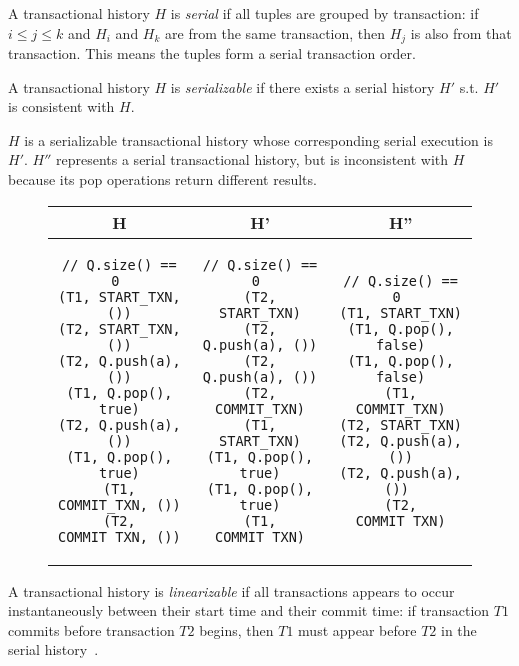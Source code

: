 \begin{defn}
    A transactional history $H$ is \emph{serial} if all tuples are grouped by transaction: if $i\le j\le k$ and $H_i$ and $H_k$ are from the same transaction, then $H_j$ is also from that transaction. This means the tuples form a serial transaction order.
\end{defn}
\begin{defn}
    A transactional history $H$ is \emph{serializable} if there exists a serial history $H'$ s.t. $H'$ is consistent with $H$.

\end{defn}

\begin{eg}
    $H$ is a serializable transactional history whose corresponding serial execution is $H'$. $H''$ represents a serial transactional history, but is inconsistent with $H$ because its pop operations return different results.
\begin{figure}[H]
\singlespacing   
   \begin{tabular}{c|c|c}
H & H' & H''\\
\hline
\begin{lstlisting}
// Q.size() == 0 
(T1, START_TXN, ())
(T2, START_TXN, ())
(T2, Q.push(a), ())
(T1, Q.pop(), true)
(T2, Q.push(a), ())
(T1, Q.pop(), true)
(T1, COMMIT_TXN, ())
(T2, COMMIT_TXN, ())
\end{lstlisting} & 
\begin{lstlisting}
// Q.size() == 0 
(T2, START_TXN)
(T2, Q.push(a), ())
(T2, Q.push(a), ())
(T2, COMMIT_TXN)
(T1, START_TXN)
(T1, Q.pop(), true)
(T1, Q.pop(), true)
(T1, COMMIT_TXN)
\end{lstlisting} &
\begin{lstlisting}
// Q.size() == 0 
(T1, START_TXN)
(T1, Q.pop(), false)
(T1, Q.pop(), false)
(T1, COMMIT_TXN)
(T2, START_TXN)
(T2, Q.push(a), ())
(T2, Q.push(a), ()) 
(T2, COMMIT_TXN)
\end{lstlisting}
\end{tabular}
\end{figure}
\end{eg}

\begin{defn}
A transactional history is \emph{linearizable} if all transactions appears to occur instantaneously between their start time and their commit time: if transaction $T1$ commits before transaction $T2$ begins, then $T1$ must appear before $T2$ in the serial history~\cite{harristm}.
\end{defn}

